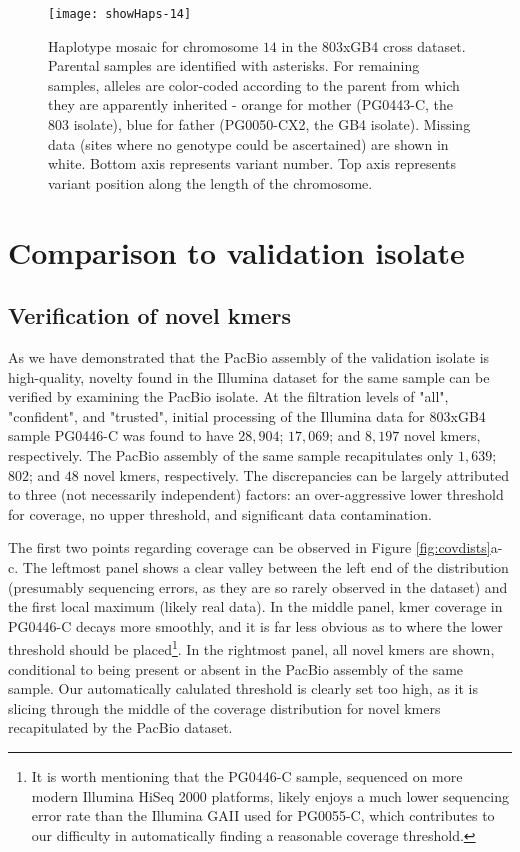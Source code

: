 \begin{figure}[h!]
  \centering
    \texttt{[image: showHaps-14]}
  \caption{Haplotype mosaic for chromosome $14$ in the 803xGB4 cross dataset.  Parental samples are identified with asterisks.  For remaining samples, alleles are color-coded according to the parent from which they are apparently inherited - orange for mother (PG0443-C, the 803 isolate), blue for father (PG0050-CX2, the GB4 isolate).  Missing data (sites where no genotype could be ascertained) are shown in white.  Bottom axis represents variant number.  Top axis represents variant position along the length of the chromosome.}
  \label{fig:showHaps}
\end{figure}

\section{Comparison to validation isolate}

\subsection{Verification of novel kmers}

As we have demonstrated that the PacBio assembly of the validation isolate is high-quality, novelty found in the Illumina dataset for the same sample can be verified by examining the PacBio isolate.  At the filtration levels of "all", "confident", and "trusted", initial processing of the Illumina data for 803xGB4 sample PG0446-C was found to have $28,904$; $17,069$; and $8,197$ novel kmers, respectively.  The PacBio assembly of the same sample recapitulates only $1,639$; $802$; and $48$ novel kmers, respectively.  The discrepancies can be largely attributed to three (not necessarily independent) factors: an over-aggressive lower threshold for coverage, no upper threshold, and significant data contamination.

The first two points regarding coverage can be observed in Figure \ref{fig:covdists}a-c.  The leftmost panel shows a clear valley between the left end of the distribution (presumably sequencing errors, as they are so rarely observed in the dataset) and the first local maximum (likely real data).  In the middle panel, kmer coverage in PG0446-C decays more smoothly, and it is far less obvious as to where the lower threshold should be placed\footnote{It is worth mentioning that the PG0446-C sample, sequenced on more modern Illumina HiSeq 2000 platforms, likely enjoys a much lower sequencing error rate than the Illumina GAII used for PG0055-C, which contributes to our difficulty in automatically finding a reasonable coverage threshold.}.  In the rightmost panel, all novel kmers are shown, conditional to being present or absent in the PacBio assembly of the same sample.  Our automatically calulated threshold is clearly set too high, as it is slicing through the middle of the coverage distribution for novel kmers recapitulated by the PacBio dataset.

